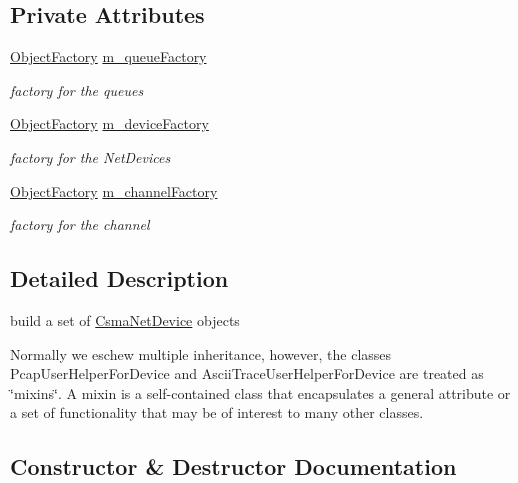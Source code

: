 \subsection*{Private Attributes}
\begin{DoxyCompactItemize}
\item 
\hyperlink{classns3_1_1ObjectFactory}{Object\+Factory} \hyperlink{classns3_1_1CsmaHelper_acd821d4c1457bb3b9e5916fe43d20f4b}{m\+\_\+queue\+Factory}
\begin{DoxyCompactList}\small\item\em factory for the queues \end{DoxyCompactList}\item 
\hyperlink{classns3_1_1ObjectFactory}{Object\+Factory} \hyperlink{classns3_1_1CsmaHelper_af5106cade4d5256195c7acdc7e0bb715}{m\+\_\+device\+Factory}
\begin{DoxyCompactList}\small\item\em factory for the Net\+Devices \end{DoxyCompactList}\item 
\hyperlink{classns3_1_1ObjectFactory}{Object\+Factory} \hyperlink{classns3_1_1CsmaHelper_a3c01647f915baaae06d12c5129722ea2}{m\+\_\+channel\+Factory}
\begin{DoxyCompactList}\small\item\em factory for the channel \end{DoxyCompactList}\end{DoxyCompactItemize}


\subsection{Detailed Description}
build a set of \hyperlink{classns3_1_1CsmaNetDevice}{Csma\+Net\+Device} objects 

Normally we eschew multiple inheritance, however, the classes Pcap\+User\+Helper\+For\+Device and Ascii\+Trace\+User\+Helper\+For\+Device are treated as \char`\"{}mixins\char`\"{}. A mixin is a self-\/contained class that encapsulates a general attribute or a set of functionality that may be of interest to many other classes. 

\subsection{Constructor \& Destructor Documentation}
